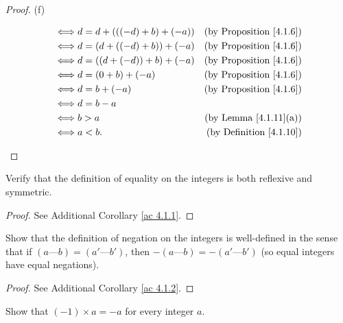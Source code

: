 \begin{proof}{(f)}
\begin{enumerate}[label=(\roman*)]
\begin{align*}
                  \iff & d = d + (((-d) + b) + (-a))     & \text{(by Proposition \ref{4.1.6})} \\
                  \iff & d = (d + ((-d) + b)) + (-a)     & \text{(by Proposition \ref{4.1.6})} \\
                  \iff & d = ((d + (-d)) + b) + (-a)     & \text{(by Proposition \ref{4.1.6})} \\
                  \iff & d = (0 + b) + (-a)              & \text{(by Proposition \ref{4.1.6})} \\
                  \iff & d = b + (-a)                    & \text{(by Proposition \ref{4.1.6})} \\
                  \iff & d = b - a                                                             \\
                  \iff & b > a                           & \text{(by Lemma \ref{4.1.11}(a))}   \\
                  \iff & a < b.                          & \text{(by Definition \ref{4.1.10})} \\
              \end{align*}
    \end{enumerate}
\end{proof}

\exercisesection

\begin{exercise}\label{ex 4.1.1}
    Verify that the definition of equality on the integers is both reflexive and symmetric.
\end{exercise}

\begin{proof}
    See Additional Corollary \ref{ac 4.1.1}.
\end{proof}

\begin{exercise}\label{ex 4.1.2}
    Show that the definition of negation on the integers is well-defined in the sense that if \((a \text{---} b) = (a' \text{---} b')\), then \(-(a \text{---} b) = -(a' \text{---} b')\)
    (so equal integers have equal negations).
\end{exercise}

\begin{proof}
    See Additional Corollary \ref{ac 4.1.2}.
\end{proof}

\begin{exercise}\label{ex 4.1.3}
    Show that \((-1) \times a = -a\) for every integer \(a\).
\end{exercise}

